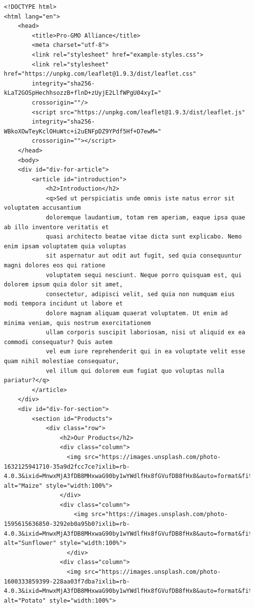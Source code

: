 \documentclass[
]{book}
\theoremstyle{definition}
\theoremstyle{definition}
\theoremstyle{definition}
\theoremstyle{definition}
\theoremstyle{remark}
\begin{document}
\begin{verbatim}
<!DOCTYPE html>
<html lang="en">
    <head>
        <title>Pro-GMO Alliance</title>
        <meta charset="utf-8">
        <link rel="stylesheet" href="example-styles.css">
        <link rel="stylesheet" href="https://unpkg.com/leaflet@1.9.3/dist/leaflet.css"
        integrity="sha256-kLaT2GOSpHechhsozzB+flnD+zUyjE2LlfWPgU04xyI="
        crossorigin=""/>
        <script src="https://unpkg.com/leaflet@1.9.3/dist/leaflet.js"
        integrity="sha256-WBkoXOwTeyKclOHuWtc+i2uENFpDZ9YPdf5Hf+D7ewM="
        crossorigin=""></script>
    </head>
    <body>
    <div id="div-for-article">
        <article id="introduction">
            <h2>Introduction</h2>
            <q>Sed ut perspiciatis unde omnis iste natus error sit voluptatem accusantium 
            doloremque laudantium, totam rem aperiam, eaque ipsa quae ab illo inventore veritatis et 
            quasi architecto beatae vitae dicta sunt explicabo. Nemo enim ipsam voluptatem quia voluptas 
            sit aspernatur aut odit aut fugit, sed quia consequuntur magni dolores eos qui ratione 
            voluptatem sequi nesciunt. Neque porro quisquam est, qui dolorem ipsum quia dolor sit amet, 
            consectetur, adipisci velit, sed quia non numquam eius modi tempora incidunt ut labore et 
            dolore magnam aliquam quaerat voluptatem. Ut enim ad minima veniam, quis nostrum exercitationem 
            ullam corporis suscipit laboriosam, nisi ut aliquid ex ea commodi consequatur? Quis autem 
            vel eum iure reprehenderit qui in ea voluptate velit esse quam nihil molestiae consequatur, 
            vel illum qui dolorem eum fugiat quo voluptas nulla pariatur?</q>
        </article>
    </div>
    <div id="div-for-section">
        <section id="Products">
            <div class="row">
                <h2>Our Products</h2>
                <div class="column">
                  <img src="https://images.unsplash.com/photo-1632125941710-35a9d2fcc7ce?ixlib=rb-4.0.3&ixid=MnwxMjA3fDB8MHxwaG90by1wYWdlfHx8fGVufDB8fHx8&auto=format&fit=crop&w=1170&q=80" alt="Maize" style="width:100%">
                </div>
                <div class="column">
                    <img src="https://images.unsplash.com/photo-1595615636850-3292eb0a95b0?ixlib=rb-4.0.3&ixid=MnwxMjA3fDB8MHxwaG90by1wYWdlfHx8fGVufDB8fHx8&auto=format&fit=crop&w=1170&q=80" alt="Sunflower" style="width:100%">
                  </div>
                <div class="column">
                  <img src="https://images.unsplash.com/photo-1600333859399-228aa03f7dba?ixlib=rb-4.0.3&ixid=MnwxMjA3fDB8MHxwaG90by1wYWdlfHx8fGVufDB8fHx8&auto=format&fit=crop&w=1170&q=80" alt="Potato" style="width:100%">

\end{verbatim}
\end{document}

